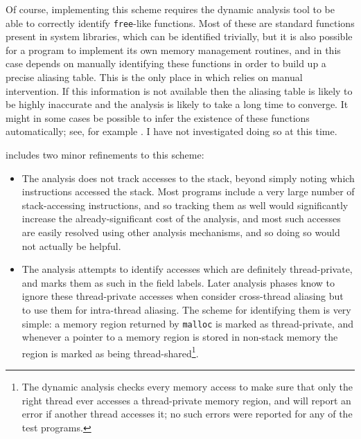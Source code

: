 Of course, implementing this scheme requires the dynamic analysis tool
to be able to correctly identify \verb|free|-like functions.  Most of
these are standard functions present in system libraries, which can be
identified trivially, but it is also possible for a program to
implement its own memory management routines, and in this case
{\technique} depends on manually identifying these functions in order
to build up a precise aliasing table.  This is the only place in which
{\technique} relies on manual intervention.  If this information is
not available then the aliasing table is likely to be highly
inaccurate and the analysis is likely to take a long time to
converge.  It might in some cases be
possible to infer the existence of these functions automatically; see,
for example .  I have not investigated doing so at this
time.

{\Implementation} includes two minor refinements to this scheme:

\begin{itemize}
\item
  The analysis does not track accesses to the stack, beyond simply
  noting which instructions accessed the stack.  Most programs include
  a very large number of stack-accessing instructions, and so tracking
  them as well would significantly increase the already-significant
  cost of the analysis, and most such accesses are easily
  resolved using other analysis mechanisms, and so doing so would not
  actually be helpful. 
\item
  The analysis attempts to identify accesses which are definitely
  thread-private, and marks them as such in the field labels.  Later
  analysis phases know to ignore these thread-private accesses when
  consider cross-thread aliasing but to use them for intra-thread
  aliasing.  The scheme for identifying them is very simple: a memory
  region returned by \verb|malloc| is marked as thread-private, and
  whenever a pointer to a memory region is stored in non-stack memory
  the region is marked as being thread-shared\footnote{The dynamic analysis checks every
    memory access to make sure that only the right thread ever
    accesses a thread-private memory region, and will report an error
    if another thread accesses it; no such errors were reported for
    any of the test programs.}.
\end{itemize}


